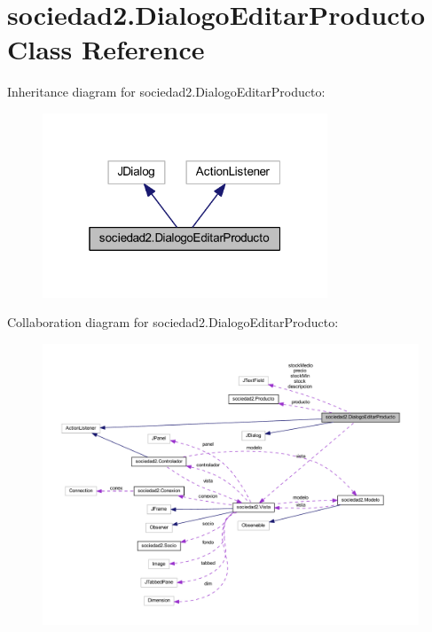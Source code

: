 \hypertarget{classsociedad2_1_1_dialogo_editar_producto}{}\section{sociedad2.\+Dialogo\+Editar\+Producto Class Reference}
\label{classsociedad2_1_1_dialogo_editar_producto}


Inheritance diagram for sociedad2.\+Dialogo\+Editar\+Producto\+:\nopagebreak
\begin{figure}[H]
\begin{center}
\leavevmode
\includegraphics[width=241pt]{classsociedad2_1_1_dialogo_editar_producto__inherit__graph}
\end{center}
\end{figure}


Collaboration diagram for sociedad2.\+Dialogo\+Editar\+Producto\+:
\nopagebreak
\begin{figure}[H]
\begin{center}
\leavevmode
\includegraphics[width=350pt]{classsociedad2_1_1_dialogo_editar_producto__coll__graph}
\end{center}
\end{figure}
